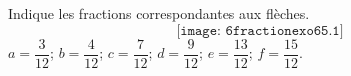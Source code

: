 Indique les fractions correspondantes aux flèches.
\[\texttt{[image: 6fractionexo65.1]}\]
$a=\dfrac3{12}$; $b=\dfrac4{12}$; $c=\dfrac7{12}$; $d=\dfrac9{12}$;
$e=\dfrac{13}{12}$; $f=\dfrac{15}{12}$.